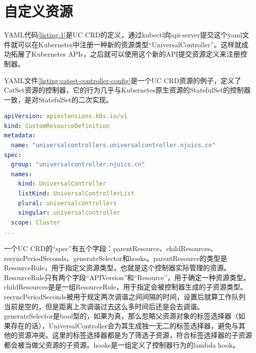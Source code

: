 \documentclass[macfonts,master]{njuthesis}
\begin{document}
\section{自定义资源}
YAML代码\ref{listing:1}是UC CRD的定义，通过kubectl向api-server提交这个yaml文件就可以在Kubernetes中注册一种新的资源类型``UniversalController''。这样就成功拓展了Kubernetes APIs，之后就可以使用这个新的API提交资源定义来注册控制器。

YAML文件\ref{listing:catset-controller-config}是一个UC CRD资源的例子，定义了CatSet资源的控制器，它的行为几乎与Kubernetes原生资源的StatefulSet的控制器一致，是对StatefulSet的二次实现。
\newpage
\begin{lstlisting}[language=yaml,caption=UC CRD,label=listing:1]
apiVersion: apiextensions.k8s.io/v1
kind: CustomResourceDefinition
metadata:
  name: "universalcontrollers.universalcontroller.njuics.cn"
spec:
  group: "universalcontroller.njuics.cn"
  names:
    kind: UniversalController
    listKind: UniversalControllerList
    plural: universalcontrollers
    singular: universalcontroller
  scope: Cluster
...
\end{lstlisting}




一个UC CRD的``spec''有五个字段：parentResource、childResources、resyncPeriodSeconds、generateSelector和hooks。parentResource的类型是ResourceRule，用于指定父资源类型，也就是这个控制器实际管理的资源。ResourceRule只有两个字段``APIVersion''和``Resource''，用于确定一种资源类型。childResources是是一组ResourceRule，用于指定会被控制器生成的子资源类型。resyncPeriodSeconds被用于规定两次调谐之间间隔的时间，设置后就算工作队列当前是空的，但是距离上次调谐过去这么多时间后还是会去调谐。generateSelector是bool型的，如果为真，那么忽略父资源对象的标签选择器（如果存在的话），UniversalController会为其生成独一无二的标签选择器，避免与其他的资源冲突。这里的标签选择器都是为了筛选子资源，符合标签选择器的子资源都会被当做父资源的子资源。hooks是一组定义了控制器行为的lambda hook。
\end{document}
